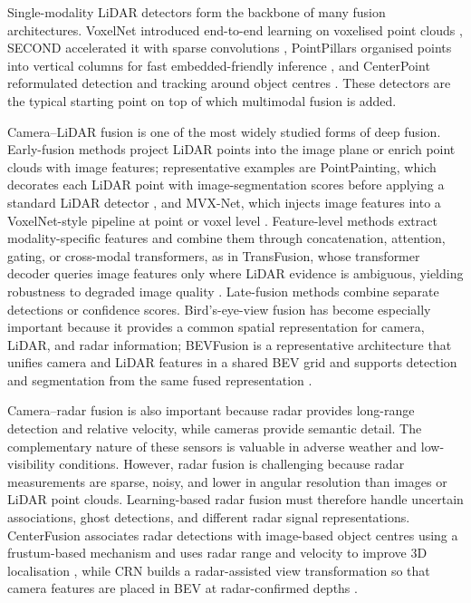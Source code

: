 \documentclass[11pt,oneside,openany]{book}
\newcommand{\added}[1]{\textcolor{RevisionBlue}{#1}}
\begin{document}
\added{Single-modality LiDAR detectors form the backbone of many fusion architectures. VoxelNet introduced end-to-end learning on voxelised point clouds \cite{zhou2018_voxelnet}, SECOND accelerated it with sparse convolutions \cite{yan2018_second}, PointPillars organised points into vertical columns for fast embedded-friendly inference \cite{lang2019_pointpillars}, and CenterPoint reformulated detection and tracking around object centres \cite{yin2021_centerpoint}. These detectors are the typical starting point on top of which multimodal fusion is added.}

Camera--LiDAR fusion is one of the most widely studied forms of deep fusion. Early-fusion methods project LiDAR points into the image plane or enrich point clouds with image features\added{; representative examples are PointPainting, which decorates each LiDAR point with image-segmentation scores before applying a standard LiDAR detector \cite{vora2020_pointpainting}, and MVX-Net, which injects image features into a VoxelNet-style pipeline at point or voxel level \cite{sindagi2019_mvxnet}}. Feature-level methods extract modality-specific features and combine them through concatenation, attention, gating, or cross-modal transformers\added{, as in TransFusion, whose transformer decoder queries image features only where LiDAR evidence is ambiguous, yielding robustness to degraded image quality \cite{bai2022_transfusion}}. Late-fusion methods combine separate detections or confidence scores. Bird's-eye-view fusion has become especially important because it provides a common spatial representation for camera, LiDAR, and radar information\added{; BEVFusion is a representative architecture that unifies camera and LiDAR features in a shared BEV grid and supports detection and segmentation from the same fused representation \cite{liu2023_bevfusion}}.

Camera--radar fusion is also important because radar provides long-range detection and relative velocity, while cameras provide semantic detail. The complementary nature of these sensors is valuable in adverse weather and low-visibility conditions. However, radar fusion is challenging because radar measurements are sparse, noisy, and lower in angular resolution than images or LiDAR point clouds. Learning-based radar fusion must therefore handle uncertain associations, ghost detections, and different radar signal representations. \added{CenterFusion associates radar detections with image-based object centres using a frustum-based mechanism and uses radar range and velocity to improve 3D localisation \cite{nabati2021_centerfusion}, while CRN builds a radar-assisted view transformation so that camera features are placed in BEV at radar-confirmed depths \cite{kim2023_crn}.}
\end{document}

